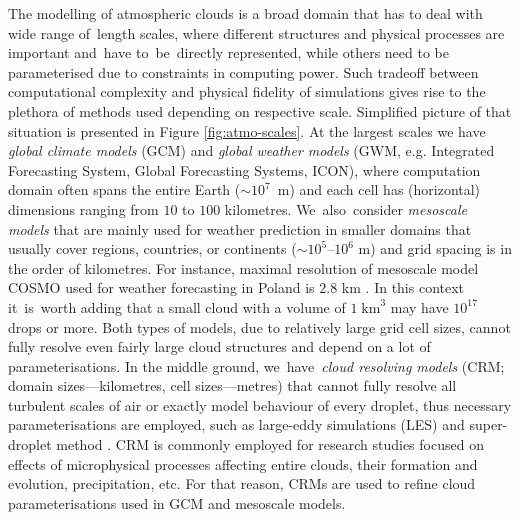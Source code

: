 \documentclass{pracamgren}
\begin{document}
The modelling of atmospheric clouds is a broad domain that has to deal with wide range of~length scales, where different structures and physical processes are important and~have to~be~directly represented, while others need to be parameterised due to constraints in computing power.
Such tradeoff between computational complexity and physical fidelity of simulations gives rise to the plethora of methods used depending on respective scale.
Simplified picture of that situation is presented in Figure \ref{fig:atmo-scales}.
At the largest scales we have \emph{global climate models} (GCM) and \emph{global weather models} (GWM, e.g. Integrated Forecasting System, Global Forecasting Systems, ICON), where computation domain  often spans the entire Earth ($\sim 10^{7}$~m) and each cell has (horizontal) dimensions ranging from $10$ to $100$ kilometres.
We~also~consider \emph{mesoscale models} that are mainly used for weather prediction in smaller domains that usually cover regions, countries, or continents ($\sim 10^{5} \text{--} 10^{6}$ m) and grid spacing is in the order of kilometres.
For instance, maximal resolution of mesoscale model COSMO used for weather forecasting in Poland is $2.8$ km \parencite{Doms2021}.
In this context it~is~worth adding that a small cloud with a volume of $1 \; \text{km}^3$ may have $10^{17}$ drops or more.
Both types of models, due to relatively large grid cell sizes, cannot fully resolve even fairly large cloud structures and depend on a lot of parameterisations.
In the middle ground, we~have~\emph{cloud resolving models} (CRM; domain sizes---kilometres, cell sizes---metres) that cannot fully resolve all turbulent scales of air or exactly model behaviour of every droplet, thus necessary parameterisations are employed, such as large-eddy simulations (LES) and super-droplet method \parencite{Arabas2013}.
CRM is commonly employed for research studies focused on effects of microphysical processes affecting entire clouds, their formation and evolution, precipitation, etc.
For that reason, CRMs are used to refine cloud parameterisations used in GCM and mesoscale models.
\end{document}
